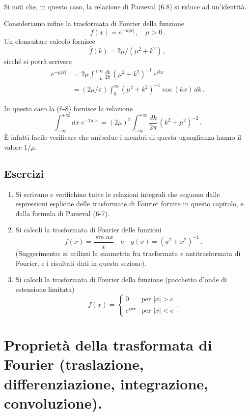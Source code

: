 \documentclass[11pt, a4paper]{book}
\numberwithin{equation}{section}
\newenvironment{esercizi}{\subsection*{Esercizi}\begin{enumerate}}{\end{enumerate}}
\begin{document}
Si noti che, in questo caso, la relazione di Parseval (6.8) si riduce ad un'identità.

Consideriamo infine la trasformata di Fourier della funzione
\begin{equation}
  f(x) = e^{-\mu|x|}\,,\quad \mu>0\,. \tag{9}
\end{equation}
Un elementare calcolo fornisce
\begin{equation}
  \hat{f}(k) = 2\mu/(\mu^2+k^2)\,, \tag{10}
\end{equation}
sicché si potrà scrivere
\begin{align}
  e^{-\mu|x|} &= 2\mu\int_{-\infty}^{+\infty}\frac{dk}{2\pi}\,(\mu^2+k^2)^{-1}\,e^{ikx} \tag{11a}\\
  &= (2\mu/\pi)\int_0^\infty (\mu^2+k^2)^{-1}\cos(kx)\,dk\,. \tag{11b}
\end{align}

In questo caso la (6-8) fornisce la relazione
\begin{equation}
  \int_{-\infty}^{+\infty} dx\;e^{-2\mu|x|}
  = (2\mu)^2\int_{-\infty}^{+\infty}\frac{dk}{2\pi}\,(k^2+\mu^2)^{-2}\,. \tag{12}
\end{equation}
È infatti facile verificare che ambedue i membri di questa uguaglianza hanno il valore $1/\mu$.

\begin{esercizi}
\item Si scrivano e verifichino tutte le relazioni integrali che seguono dalle espressioni esplicite delle trasformate di Fourier fornite in questo capitolo, e dalla formula di Parseval (6-7).

\item Si calcoli la trasformata di Fourier delle funzioni
\[
  f(x) = \frac{\sin ax}{x}\quad\text{e}\quad g(x) = (a^2+x^2)^{-1}\,.
\]
(Suggerimento: si utilizzi la simmetria fra trasformata e antitrasformata di Fourier, e i risultati dati in questa sezione).

\item Si calcoli la trasformata di Fourier della funzione (pacchetto d'onde di estensione limitata)
\[
  f(x) = \begin{cases} 0 & \text{per } |x|>c \\ e^{ipx} & \text{per } |x|<c \end{cases}\,.
\]
\end{esercizi}

\section{Proprietà della trasformata di Fourier (traslazione, differenziazione, integrazione, convoluzione).}
\end{document}
